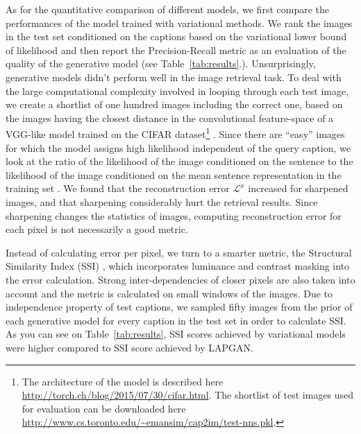 \documentclass{article} %
\newcommand{\rloss}{\mathcal{L}^{x}}
\begin{document}
As for the quantitative comparison of different models, we first compare the performances of the model trained with variational methods. We rank the images in the test set conditioned on the captions based on the variational lower bound of likelihood and then report the Precision-Recall metric as an evaluation of the quality of the generative model (see Table~\ref{tab:results}.). Unsurprisingly, generative models didn't perform well in the image retrieval task. To deal with the large computational complexity involved in looping through each test image, we create a shortlist of one hundred images including the correct one, based on the images having the closest distance in the convolutional feature-space of a VGG-like model \citep{simonyan_convnet} trained on the CIFAR dataset\footnote{The architecture of the model is described here \url{http://torch.ch/blog/2015/07/30/cifar.html}. The shortlist of test images used for evaluation can be downloaded here \url{http://www.cs.toronto.edu/~emansim/cap2im/test-nns.pkl}.} \citep{krizhevsky_cifar}. 
Since there are ``easy'' images for which the model assigns high likelihood independent of the query caption, we look at the ratio of the likelihood of the image conditioned on the sentence to the likelihood of the image conditioned on the mean sentence representation in the training set \citep{kiros_captions}. 
We found that the reconstruction error $\rloss$ increased for sharpened images, and that sharpening considerably hurt the retrieval results. Since sharpening changes the statistics of images, computing reconstruction error for each pixel is not necessarily a good metric.

Instead of calculating error per pixel, we turn to a smarter metric, the Structural Similarity Index (SSI) \citep{wang_ssi}, which incorporates luminance and contrast masking into the error calculation. Strong inter-dependencies of closer pixels are also taken into account and the metric is calculated on small windows of the images. Due to independence property of test captions, we sampled fifty images from the prior of each generative model for every caption in the test set in order to calculate SSI. As you can see on Table~\ref{tab:results}, SSI scores achieved by variational models were higher compared to SSI score achieved by LAPGAN.
\end{document}
